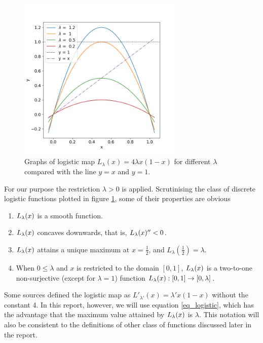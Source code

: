 \begin{figure}[t]
	\centering
	\includegraphics[width=0.7\textwidth]{./figures/logistic_map_diff_lambda.png}
	\caption{Graphs of logistic map $L_{\lambda}(x) = 4 \lambda x(1-x)$ for different $\lambda$ compared with the line $y=x$ and $y = 1$.} 
	\label{fig:logistic_map_diff_lambda}
\end{figure}


For our purpose the restriction $\lambda >0$ is applied.
Scrutinising the class of discrete logistic functions plotted in figure \ref{fig:logistic_map_diff_lambda}, some of their properties are obvious

\begin{enumerate}
	\item $L_{\lambda}(x)$ is a smooth function.
	\item $L_{\lambda}(x)$ concaves downwards, that is, $L_{\lambda}(x)'' < 0$.
	\item $L_{\lambda}(x)$ attains a unique maximum at $x = \frac{1}{2}$, and $L_{\lambda}(\frac{1}{2}) = \lambda$.
	\item When $0 \leq \lambda$ and $x$ is restricted to the domain $[0, 1]$, $L_{\lambda}(x)$ is a two-to-one non-surjective (except for $\lambda = 1$) function $L_{\lambda}(x): [0,1] \rightarrow [0,\lambda]$. 
\end{enumerate}

Some sources defined the logistic map as $L'_{\lambda'}(x) = \lambda' x(1-x)$ without the constant 4. 
In this report, however, we will use equation \ref{eq_logistic}, which has the advantage that the maximum value attained by $L_{\lambda}(x)$ is $\lambda$. This notation will also be consistent to the definitions of other class of functions discussed later in the report.

